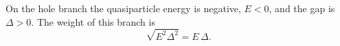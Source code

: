 \documentclass{article}
\begin{document}
On the hole branch the quasiparticle energy is negative, $E<0$, and the gap is $\Delta>0$.
The weight of this branch is
\begin{equation}
\sqrt{E^2\Delta^2} = E\,\Delta .
\label{eq:w}
\end{equation}
\end{document}
